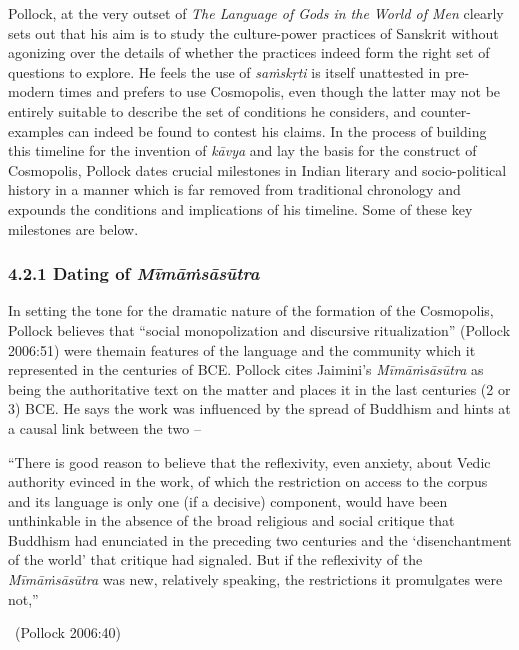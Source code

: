 Pollock, at the very outset of \textit{The Language of Gods in the World of Men} clearly sets out that his aim is to study the culture-power practices of Sanskrit without agonizing over the details of whether the practices indeed form the right set of questions to explore. He feels the use of \textit{saṁskṛti} is itself unattested in pre-modern times and prefers to use Cosmopolis, even though the latter may not be entirely suitable to describe the set of conditions he considers, and counter-examples can indeed be found to contest his claims. In the process of building this timeline for the invention of \textit{kāvya} and lay the basis for the construct of Cosmopolis, Pollock dates crucial milestones in Indian literary and socio-political history in a manner which is far removed from traditional chronology and expounds the conditions and implications of his timeline. Some of these key milestones are below.

\vspace{-.4cm}

\subsubsection*{4.2.1 Dating of \textit{Mīmāṁsāsūtra}}

In setting the tone for the dramatic nature of the formation of the Cosmopolis, Pollock believes that “social monopolization and discursive ritualization” (Pollock 2006:51) were themain features of the language and the community which it represented in the centuries of BCE. Pollock cites Jaimini’s \textit{Mīmāṁsāsūtra} as being the authoritative text on the matter and places it in the last centuries (2 or 3) BCE. He says the work was influenced by the spread of Buddhism and hints at a causal link between the two –

\begin{myquote}
“There is good reason to believe that the reflexivity, even anxiety, about Vedic authority evinced in the work, of which the restriction on access to the corpus and its language is only one (if a decisive) component, would have been unthinkable in the absence of the broad religious and social critique that Buddhism had enunciated in the preceding two centuries and the ‘disenchantment of the world’ that critique had signaled. But if the reflexivity of the \textit{Mīmāṁsāsūtra} was new, relatively speaking, the restrictions it promulgates were not,” 

~\hfill (Pollock 2006:40)
\end{myquote}

